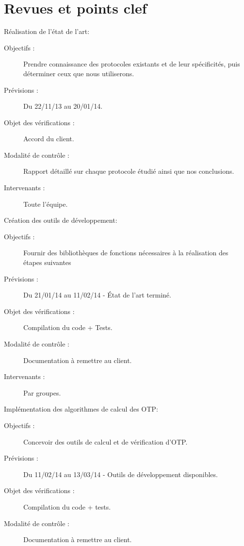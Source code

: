 \documentclass{../../res/univ-projet}
\begin{document}
	\newpage
\section{Revues et points clef}

\begin{description}
	\item Réalisation de l'état de l'art:
	\begin{description}
		\item[Objectifs :] Prendre connaissance des protocoles existants et de leur spécificités, puis déterminer ceux que nous utiliserons.
		\item[Prévisions :] Du 22/11/13 au 20/01/14.
		\item[Objet des vérifications :] Accord du client.
		\item[Modalité de contrôle :] Rapport détaillé sur chaque protocole étudié ainsi que nos conclusions.
		\item[Intervenants :] Toute l'équipe.
	\end{description}
	\vfill
	\item Création des outils de développement:
	\begin{description}
		\item[Objectifs :] Fournir des bibliothèques de fonctions nécessaires à la réalisation des étapes suivantes
		\item[Prévisions :] Du 21/01/14 au 11/02/14 - État de l'art terminé.
		\item[Objet des vérifications :] Compilation du code + Tests.
		\item[Modalité de contrôle :] Documentation à remettre au client.
		\item[Intervenants :] Par groupes.
	\end{description}
	\vfill
	\item Implémentation des algorithmes de calcul des OTP:
	\begin{description}
		\item[Objectifs :] Concevoir des outils de calcul et de vérification d'OTP.
		\item[Prévisions :] Du 11/02/14 au 13/03/14 - Outils de développement disponibles.
		\item[Objet des vérifications :] Compilation du code + tests.
		\item[Modalité de contrôle :] Documentation à remettre au client.

\end{description}
\end{description}
\end{document}
